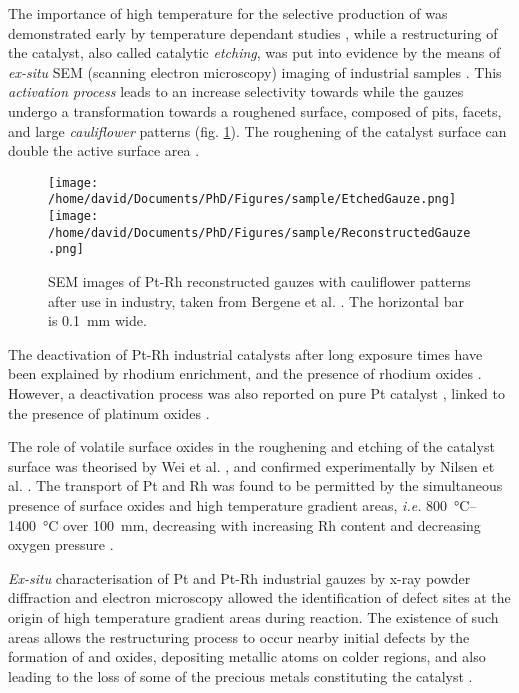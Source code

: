 The importance of high temperature for the selective production of  was demonstrated early by temperature dependant studies \parencite{Nutt1968, Pignet1974, Li1997}, while a restructuring of the catalyst, also called catalytic \textit{etching}, was put into evidence by the means of \textit{ex-situ} SEM (scanning electron microscopy) imaging of industrial samples \parencite{McCabe1974, FlytzaniStephanopoulos1979, McCabe1986}.
This \textit{activation process} leads to an increase selectivity towards  while the gauzes undergo a transformation towards a roughened surface, composed of pits, facets, and large \textit{cauliflower} patterns (fig. \ref{fig:Gauzes}).
The roughening of the catalyst surface can double the active surface area \parencite{Hatscher2008}.

\begin{figure}[!htb]
    \centering
    \texttt{[image: /home/david/Documents/PhD/Figures/sample/EtchedGauze.png]}
    \texttt{[image: /home/david/Documents/PhD/Figures/sample/ReconstructedGauze.png]}
    \caption{
    SEM images of Pt-Rh reconstructed gauzes with cauliflower patterns after use in industry, taken from Bergene et al. \parencite*{Bergene1996}.
    The horizontal bar is \qty{0.1}{\mm} wide.
    }
    \label{fig:Gauzes}
\end{figure}

The deactivation of Pt-Rh industrial catalysts after long exposure times have been explained by rhodium enrichment, and the presence of rhodium oxides \parencite{Fierro1992, Bergene1996}.
However, a deactivation process was also reported on pure Pt catalyst \parencite{Ostermaier1974}, linked to the presence of platinum oxides \parencite{Ostermaier1976}.

The role of volatile surface oxides in the roughening and etching of the catalyst surface was theorised by Wei et al. \parencite*{Wei1996}, and confirmed experimentally by Nilsen et al. \parencite*{Nilsen2001}.
The transport of Pt and Rh was found to be permitted by the simultaneous presence of surface oxides and high temperature gradient areas, \textit{i.e.} \qtyrange{800}{1400}{\degreeCelsius} over \qty{100}{\mm}, decreasing with increasing Rh content and decreasing oxygen pressure \parencite{Hannevold2005a}.

\textit{Ex-situ} characterisation of Pt and Pt-Rh industrial gauzes by x-ray powder diffraction and electron microscopy allowed the identification of defect sites at the origin of high temperature gradient areas during reaction.
The existence of such areas allows the restructuring process to occur nearby initial defects by the formation of  and  oxides, depositing metallic atoms on colder regions, and also leading to the loss of some of the precious metals constituting the catalyst \parencite{Hannevold2005}.

